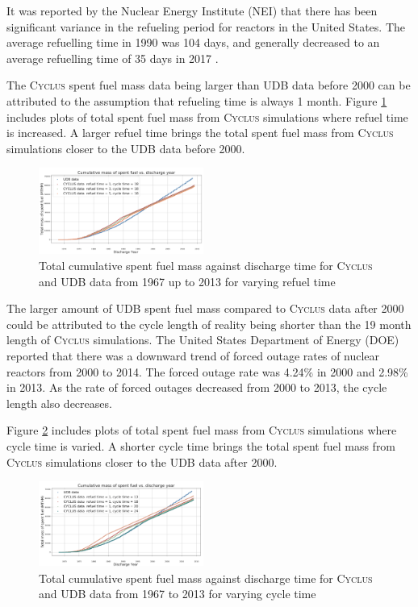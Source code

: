 \documentclass{anstrans}
\newcommand{\Cyclus}{\textsc{Cyclus}\xspace}%
\begin{document}
It was reported by the Nuclear Energy Institute (NEI) that there has been significant variance in the refueling period for reactors in the United States. The average refuelling time in 1990 was 104 days, and generally decreased to an average refuelling time of 35 days in 2017 \cite{nei}.

The \Cyclus spent fuel mass data being larger than UDB data before 2000 can be attributed to the assumption that refueling time is always 1 month. Figure \ref{fig:total_refueltime} includes plots of total spent fuel mass from \Cyclus simulations where refuel time is increased. A larger refuel time brings the total spent fuel mass from \Cyclus simulations closer to the UDB data before 2000. 

\begin{figure}[ht] %
	\centering
	\includegraphics[width=0.48\textwidth]{total_cumulative_mass_spent_fuel_refueltime}
	\caption{Total cumulative spent fuel mass against discharge time for \Cyclus and UDB data from 1967 up to 2013 for varying refuel time}
	\label{fig:total_refueltime}
\end{figure} 

The larger amount of UDB spent fuel mass compared to \Cyclus data after 2000 could be attributed to the cycle length of reality being shorter than the 19 month length of \Cyclus simulations. The United States Department of Energy (DOE) reported that there was a downward trend of forced outage rates of nuclear reactors from 2000 to 2014. The forced outage rate was 4.24\% in 2000 and 2.98\% in 2013. As the rate of forced outages decreased from 2000 to 2013, the cycle length also decreases. 

Figure \ref{fig:total_cycletime} includes plots of total spent fuel mass from \Cyclus simulations where cycle time is varied. A shorter cycle time brings the total spent fuel mass from \Cyclus simulations closer to the UDB data after 2000. 

\begin{figure}[ht] %
	\centering
	\includegraphics[width=0.48\textwidth]{total_cumulative_mass_spent_fuel_cycletime}
	\caption{Total cumulative spent fuel mass against discharge time for \Cyclus and UDB data from 1967 to 2013 for varying cycle time}
	\label{fig:total_cycletime}
\end{figure} 
\end{document}
